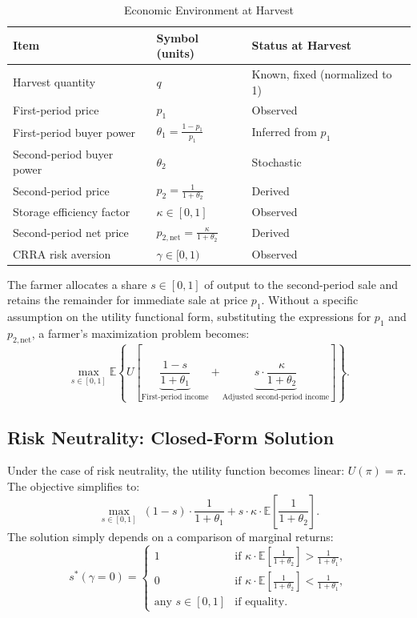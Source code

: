 \begin{table}[H]
\centering
\caption{Economic Environment at Harvest}
\label{tab:baseline model parameter table}
\begin{tabular}{lll}
\toprule
\textbf{Item} & \textbf{Symbol (units)} & \textbf{Status at Harvest} \\
\midrule
Harvest quantity & $q$ & Known, fixed (normalized to 1) \\
First-period price & $p_1$ & Observed \\
First-period buyer power & $\theta_1 = \frac{1 - p_1}{p_1}$ & Inferred from $p_1$ \\
Second-period buyer power & $\theta_2$ & Stochastic \\
Second-period price & $p_2 = \frac{1}{1 + \theta_2}$ & Derived \\
Storage efficiency factor & $\kappa \in [0,1]$ & Observed \\
Second-period net price & $p_{2,\text{net}} = \frac{\kappa}{1 + \theta_2}$ & Derived \\
CRRA risk aversion & $\gamma \in [0,1)$ & Observed \\
\bottomrule
\end{tabular}
\end{table}

\noindent The farmer allocates a share $s \in [0,1]$ of output to the second-period sale and retains the remainder for immediate sale at price $p_1$. Without a specific assumption on the utility functional form, substituting the expressions for $p_1$ and $p_{2,\text{net}}$, a farmer's maximization problem becomes:
\begin{equation}
\label{eq:final objective}
\max_{s \in [0,1]} \mathbb{E} \left\{U\left[\underbrace{\frac{1-s}{1+\theta_1}}_{\text{First-period income}} + \underbrace{s \cdot \frac{\kappa}{1+\theta_2}}_{\text{Adjusted second-period income}} \right]\right\}.
\end{equation}


\subsection{Risk Neutrality: Closed-Form Solution}
\noindent Under the case of risk neutrality, the utility function becomes linear: $U(\pi) = \pi$. The objective simplifies to:
\begin{equation}
\max_{s \in [0,1]} \; 
(1 - s) \cdot \frac{1}{1 + \theta_1} 
+ 
s \cdot \kappa \cdot \mathbb{E} \left[ \frac{1}{1 + \theta_2} \right].
\end{equation}
The solution simply depends on a comparison of marginal returns:
\begin{equation}
s^*( \gamma = 0) =
\begin{cases}
1 & \text{if } \kappa \cdot \mathbb{E} \left[ \frac{1}{1 + \theta_2} \right] > \frac{1}{1 + \theta_1}, \\
0 & \text{if } \kappa \cdot \mathbb{E} \left[ \frac{1}{1 + \theta_2} \right] < \frac{1}{1 + \theta_1}, \\
\text{any } s \in [0,1] & \text{if equality}.
\end{cases}
\label{Eq: risk-neutrality solution}
\end{equation}

